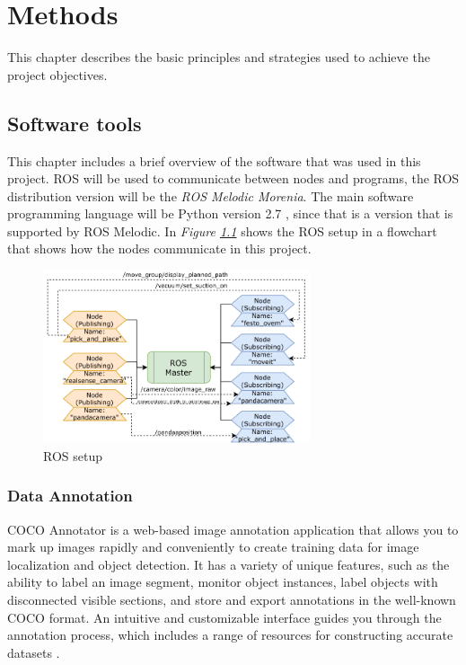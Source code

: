 \chapter{Methods}
This chapter describes the basic principles and strategies used to achieve the project objectives. 
\section{Software tools}

This chapter includes a brief overview of the software that was used in this project. 
ROS will be used to communicate between nodes and programs, the ROS distribution version will be the \textit{ROS Melodic Morenia}\cite{marguedas_ros_2018}. 
The main software programming language will be Python version 2.7 \cite{noauthor_python_nodate}, since that is a version that is supported by ROS Melodic.
In \textit{Figure \ref{fig:roswork}} shows the ROS setup in a flowchart that shows how the nodes communicate in this project.
\begin{figure}[h]
    \centering
    \includegraphics[width=0.7\textwidth]{graphics/ros.pdf}
    \caption{ROS setup}
    \label{fig:roswork}
\end{figure}


\subsection{Data Annotation}
COCO Annotator is a web-based image annotation application that allows you to mark up images rapidly and conveniently to create training data for image localization and object detection. It has a variety of unique features, such as the ability to label an image segment, monitor object instances, label objects with disconnected visible sections, and store and export annotations in the well-known COCO format. An intuitive and customizable interface guides you through the annotation process, which includes a range of resources for constructing accurate datasets \cite{brooks_jsbrokscoco-annotator_2021}.

